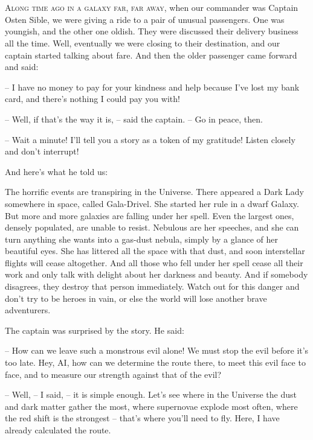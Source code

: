 \documentclass[ebook,oneside,final,openright]{memoir}
\begin{document}
\chapter{}
\par
\lettrine{A}{long time ago in a galaxy far, far away,} when our commander was Captain Osten Sible, we were giving a ride to a pair of unusual passengers. One was youngish, and the other one oldish. They were discussed their delivery business all the time. Well, eventually we were closing to their destination, and our captain started talking about fare. And then the older passenger came forward and said: \par
\par
– I have no money to pay for your kindness and help because I’ve lost my bank card, and there’s nothing I could pay you with!\par
– Well, if that’s the way it is, – said the captain. – Go in peace, then. \par
– Wait a minute! I’ll tell you a story as a token of my gratitude! Listen closely and don’t interrupt! \par
 And here’s what he told us:\par
\par
The horrific events are transpiring in the Universe. There appeared a Dark Lady somewhere in space, called Gala-Drivel. She started her rule in a dwarf Galaxy. But more and more galaxies are falling under her spell. Even the largest ones, densely populated, are unable to resist. Nebulous are her speeches, and she can turn anything she wants into a gas-dust nebula, simply by a glance of her beautiful eyes. She has littered all the space with that dust, and soon interstellar flights will cease altogether. And all those who fell under her spell cease all their work and only talk with delight about her darkness and beauty. And if somebody disagrees, they destroy that person immediately. Watch out for this danger and don’t try to be heroes in vain, or else the world will lose another brave adventurers.\par
\par
The captain was surprised by the story. He said:\par
– How can we leave such a monstrous evil alone! We must stop the evil before it’s too late. Hey, AI, how can we determine the route there, to meet this evil face to face, and to measure our strength against that of the evil?\par
– Well, – I said, – it is simple enough. Let’s see where in the Universe the dust and dark matter gather the most, where supernovae explode most often, where the red shift is the strongest – that’s where you’ll need to fly. Here, I have already calculated the route.\par
\end{document}
